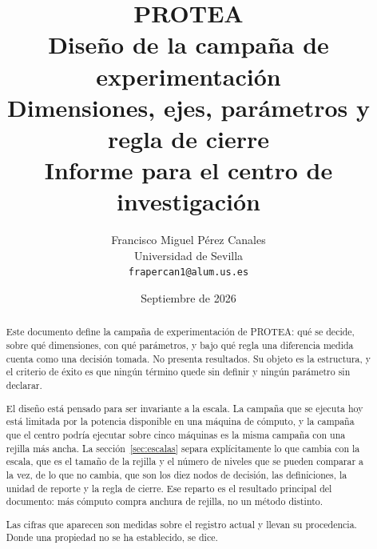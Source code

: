 

\title{\textbf{PROTEA}\\[0.35em]
  \large Diseño de la campaña de experimentación\\
  \normalsize Dimensiones, ejes, parámetros y regla de cierre\\[0.7em]
  \small Informe para el centro de investigación}

\author{Francisco Miguel Pérez Canales\\
  \small Universidad de Sevilla\\
  \small \texttt{frapercan1@alum.us.es}}

\date{Septiembre de 2026}


\maketitle
\thispagestyle{empty}

\begin{abstract}
\noindent
Este documento define la campaña de experimentación de PROTEA: qué se decide,
sobre qué dimensiones, con qué parámetros, y bajo qué regla una diferencia
medida cuenta como una decisión tomada. No presenta resultados. Su objeto es la
estructura, y el criterio de éxito es que ningún término quede sin definir y
ningún parámetro sin declarar.

El diseño está pensado para ser invariante a la escala. La campaña que se
ejecuta hoy está limitada por la potencia disponible en una máquina de cómputo,
y la campaña que el centro podría ejecutar sobre cinco máquinas es la misma
campaña con una rejilla más ancha. La sección~\ref{sec:escalas} separa
explícitamente lo que cambia con la escala, que es el tamaño de la rejilla y el
número de niveles que se pueden comparar a la vez, de lo que no cambia, que son
los diez nodos de decisión, las definiciones, la unidad de reporte y la regla
de cierre. Ese reparto es el resultado principal del documento: más cómputo
compra anchura de rejilla, no un método distinto.

Las cifras que aparecen son medidas sobre el registro actual y llevan su
procedencia. Donde una propiedad no se ha establecido, se dice.
\end{abstract}

